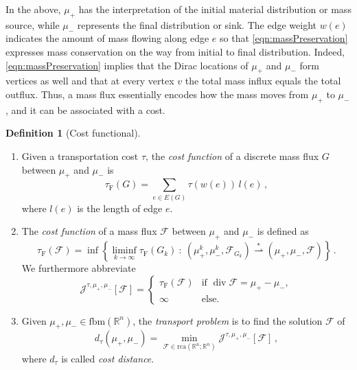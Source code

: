 \documentclass[10pt,a4paper,oneside,final]{article}
\newcommand{\R}{{\mathbb{R}}}
\DeclareMathOperator{\dv}{div}
\newcommand{\rca}{\mathrm{rca}}
\newcommand{\fbm}{{\mathrm{fbm}}}
\newcommand{\weakstarto}{\stackrel{*}{\rightharpoonup}}
\newcommand{\flux}{{\mathcal{F}}}
\newcommand{\JEn}{{\mathcal{J}}}
\newcommand{\JEnXia}[1][\tau]{#1_{\mathrm{F}}}%
\newcommand{\dtau}{d_\tau}
\newcommand{\transportPath}{mass flux}
\numberwithin{equation}{section}
\theoremstyle{plain}
\theoremstyle{definition}
\newtheorem{definition}[theorem]{Definition}
\theoremstyle{remark}
\begin{document}
In the above, $\mu_+$ has the interpretation of the initial material distribution or mass source, while $\mu_-$ represents the final distribution or sink.
The edge weight $w(e)$ indicates the amount of mass flowing along edge $e$
so that \eqref{eqn:massPreservation} expresses mass conservation on the way from initial to final distribution.
Indeed, \eqref{eqn:massPreservation} implies that the Dirac locations of $\mu_+$ and $\mu_-$ form vertices as well and that at every vertex $v$ the total mass influx equals the total outflux.
Thus, a \transportPath{} essentially encodes how the mass moves from $\mu_+$ to $\mu_-$, and it can be associated with a cost.

\begin{definition}[Cost functional]\label{def:costXia}
\begin{enumerate}
\item Given a transportation cost $\tau$, the \emph{cost function} of a discrete \transportPath{} $G$ between $\mu_+$ and $\mu_-$ is
\begin{displaymath}
 \JEnXia(G) = \sum_{e \in E(G)} \tau(w(e))\,l(e)\,,
\end{displaymath}
where $l(e)$ is the length of edge $e$.

\item The \emph{cost function} of a \transportPath{} $\flux$ between $\mu_+$ and $\mu_-$ is defined as
\begin{equation}\label{eq:functional_XiaEn}
 \JEnXia(\flux) = \inf\left\{\liminf_{k \to \infty} \JEnXia(G_k) \ : \ (\mu_+^k,\mu_-^k,\flux_{G_k}) \weakstarto (\mu_+,\mu_-,\flux)\right\}\,.
\end{equation}
We furthermore abbreviate
\begin{equation*}
\JEn^{\tau,\mu_+,\mu_-}[\flux]
=\begin{cases}
\JEnXia(\flux)&\text{if }\dv\flux=\mu_+-\mu_-,\\
\infty&\text{else.}
\end{cases}
\end{equation*}

\item Given $\mu_+,\mu_- \in \fbm(\R^n)$, the \emph{transport problem} is to find the solution $\flux$ of
\begin{equation*}
\dtau(\mu_+,\mu_-)
= \min_{\flux\in\rca(\R^n;\R^n)}\JEn^{\tau,\mu_+,\mu_-}[\flux]\,,
\end{equation*}
where $\dtau$ is called \emph{cost distance}.
\end{enumerate}
\end{definition}
\end{document}
